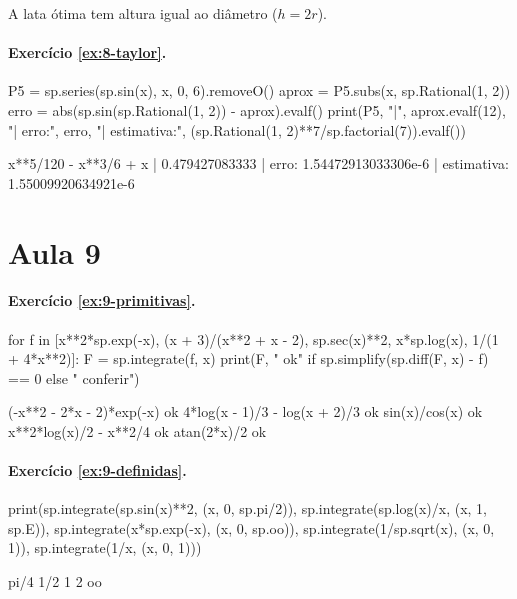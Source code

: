 A lata ótima tem altura igual ao diâmetro ($h=2r$).

\paragraph{Exercício \ref{ex:8-taylor}.}
\begin{entrada}
P5 = sp.series(sp.sin(x), x, 0, 6).removeO()
aprox = P5.subs(x, sp.Rational(1, 2))
erro = abs(sp.sin(sp.Rational(1, 2)) - aprox).evalf()
print(P5, "|", aprox.evalf(12), "| erro:", erro, "| estimativa:", (sp.Rational(1, 2)**7/sp.factorial(7)).evalf())
\end{entrada}
\begin{saida}
x**5/120 - x**3/6 + x | 0.479427083333 | erro: 1.54472913033306e-6 | estimativa: 1.55009920634921e-6
\end{saida}

\section*{Aula 9}

\paragraph{Exercício \ref{ex:9-primitivas}.}
\begin{entrada}
for f in [x**2*sp.exp(-x), (x + 3)/(x**2 + x - 2), sp.sec(x)**2, x*sp.log(x), 1/(1 + 4*x**2)]:
    F = sp.integrate(f, x)
    print(F, "   ok" if sp.simplify(sp.diff(F, x) - f) == 0 else "   conferir")
\end{entrada}
\begin{saida}
(-x**2 - 2*x - 2)*exp(-x)    ok
4*log(x - 1)/3 - log(x + 2)/3    ok
sin(x)/cos(x)    ok
x**2*log(x)/2 - x**2/4    ok
atan(2*x)/2    ok
\end{saida}

\paragraph{Exercício \ref{ex:9-definidas}.}
\begin{entrada}
print(sp.integrate(sp.sin(x)**2, (x, 0, sp.pi/2)), sp.integrate(sp.log(x)/x, (x, 1, sp.E)),
      sp.integrate(x*sp.exp(-x), (x, 0, sp.oo)), sp.integrate(1/sp.sqrt(x), (x, 0, 1)),
      sp.integrate(1/x, (x, 0, 1)))
\end{entrada}
\begin{saida}
pi/4 1/2 1 2 oo
\end{saida}


